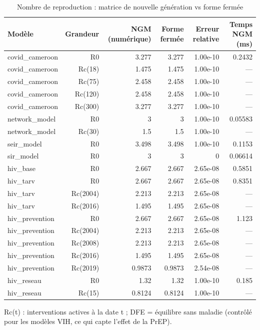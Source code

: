 \begin{table}[htbp]
\centering
\small
\caption{Nombre de reproduction : matrice de nouvelle génération vs forme fermée}
\label{tab:bench-b3}
\begin{tabular}{lrrrrr}
\toprule
Modèle & Grandeur & NGM (numérique) & Forme fermée & Erreur relative & Temps NGM (ms) \\
\midrule
covid\_cameroon & R0 & 3.277 & 3.277 & 1.00e-10 & 0.2432 \\
covid\_cameroon & Rc(18) & 1.475 & 1.475 & 1.00e-10 & — \\
covid\_cameroon & Rc(75) & 2.458 & 2.458 & 1.00e-10 & — \\
covid\_cameroon & Rc(120) & 2.458 & 2.458 & 1.00e-10 & — \\
covid\_cameroon & Rc(300) & 3.277 & 3.277 & 1.00e-10 & — \\
network\_model & R0 & 3 & 3 & 1.00e-10 & 0.05583 \\
network\_model & Rc(30) & 1.5 & 1.5 & 1.00e-10 & — \\
seir\_model & R0 & 3.498 & 3.498 & 1.00e-10 & 0.1153 \\
sir\_model & R0 & 3 & 3 & 0 & 0.06614 \\
hiv\_base & R0 & 2.667 & 2.667 & 2.65e-08 & 0.5851 \\
hiv\_tarv & R0 & 2.667 & 2.667 & 2.65e-08 & 0.8351 \\
hiv\_tarv & Rc(2004) & 2.213 & 2.213 & 2.65e-08 & — \\
hiv\_tarv & Rc(2016) & 1.495 & 1.495 & 2.65e-08 & — \\
hiv\_prevention & R0 & 2.667 & 2.667 & 2.65e-08 & 1.123 \\
hiv\_prevention & Rc(2004) & 2.213 & 2.213 & 2.65e-08 & — \\
hiv\_prevention & Rc(2008) & 2.213 & 2.213 & 2.65e-08 & — \\
hiv\_prevention & Rc(2016) & 1.495 & 1.495 & 2.65e-08 & — \\
hiv\_prevention & Rc(2019) & 0.9873 & 0.9873 & 2.54e-08 & — \\
hiv\_reseau & R0 & 1.32 & 1.32 & 1.00e-10 & 0.185 \\
hiv\_reseau & Rc(15) & 0.8124 & 0.8124 & 1.00e-10 & — \\
\bottomrule
\end{tabular}
\par\smallskip\footnotesize Rc(t) : interventions actives à la date t ; DFE = équilibre sans maladie (contrôlé pour les modèles VIH, ce qui capte l'effet de la PrEP).
\end{table}


